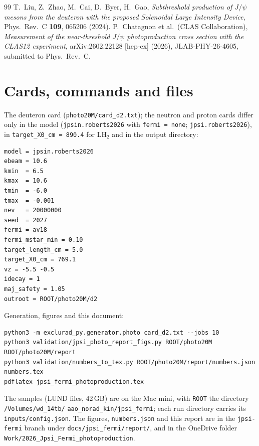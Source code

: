 \documentclass[11pt,a4paper]{article}
\begin{document}
\begin{thebibliography}{99}
 T.~Liu, Z.~Zhao, M.~Cai, D.~Byer, H.~Gao, \emph{Subthreshold production of $J/\psi$ mesons
from the deuteron with the proposed Solenoidal Large Intensity Device}, Phys.\ Rev.\ C \textbf{109}, 065206 (2024).
 P.~Chatagnon et al.\ (CLAS Collaboration), \emph{Measurement of the
near-threshold $J/\psi$ photoproduction cross section with the CLAS12 experiment},
arXiv:2602.22128 [hep-ex] (2026), JLAB-PHY-26-4605, submitted to Phys.\ Rev.\ C.
\end{thebibliography}

\appendix

\section{Cards, commands and files}
\label{app:cards}

The deuteron card (\texttt{photo20M/card\_d2.txt}); the neutron and proton cards differ only in the
model (\texttt{jpsin.roberts2026} with \texttt{fermi = none}; \texttt{jpsi.roberts2026}), in
\texttt{target\_X0\_cm = 890.4} for LH$_2$ and in the output directory:
\begin{verbatim}
model = jpsin.roberts2026
ebeam = 10.6
kmin  = 6.5
kmax  = 10.6
tmin  = -6.0
tmax  = -0.001
nev   = 20000000
seed  = 2027
fermi = av18
fermi_mstar_min = 0.10
target_length_cm = 5.0
target_X0_cm = 769.1
vz = -5.5 -0.5
idecay = 1
maj_safety = 1.05
outroot = ROOT/photo20M/d2
\end{verbatim}
Generation, figures and this document:
\begin{verbatim}
python3 -m exclurad_py.generator.photo card_d2.txt --jobs 10
python3 validation/jpsi_photo_report_figs.py ROOT/photo20M ROOT/photo20M/report
python3 validation/numbers_to_tex.py ROOT/photo20M/report/numbers.json numbers.tex
pdflatex jpsi_fermi_photoproduction.tex
\end{verbatim}
The samples (LUND files, 42\,GB) are on the Mac mini, with \texttt{ROOT} the directory
\texttt{/Volumes/wd\_14tb/} \texttt{aao\_norad\_kin/jpsi\_fermi}; each run directory carries its
\texttt{inputs/config.json}.  The figures, \texttt{numbers.json} and this report are in the
\texttt{jpsi-fermi} branch under \texttt{docs/jpsi\_fermi/report/}, and in the OneDrive folder
\texttt{Work/2026\_Jpsi\_Fermi\_photoproduction}.
\end{document}
